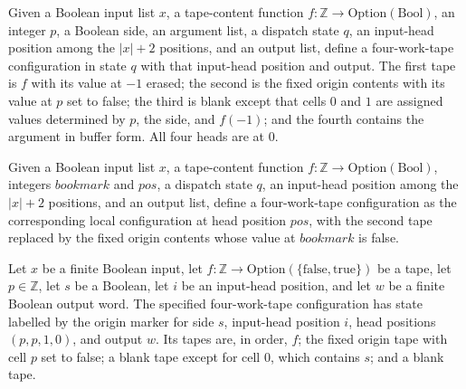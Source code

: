 \begin{definition}
\label{Turing.oracleReadyCfg}
\leanok
{}
Given a Boolean input list $x$, a tape-content function $f:\mathbb
Z\to\mathrm{Option}(\mathrm{Bool})$, an integer $p$, a Boolean side, an argument list, a
dispatch state $q$, an input-head position among the $|x|+2$ positions, and an output
list, define a four-work-tape configuration in state $q$ with that input-head position
and output. The first tape is $f$ with its value at $-1$ erased; the second is the fixed
origin contents with its value at $p$ set to false; the third is blank except that cells
$0$ and $1$ are assigned values determined by $p$, the side, and $f(-1)$; and the fourth
contains the argument in buffer form. All four heads are at $0$.
\end{definition}

\begin{definition}
\label{Turing.oracleBackCfg}
\leanok
{}
Given a Boolean input list $x$, a tape-content function $f:\mathbb
Z\to\mathrm{Option}(\mathrm{Bool})$, integers $bookmark$ and $pos$, a dispatch state
$q$, an input-head position among the $|x|+2$ positions, and an output list, define a
four-work-tape configuration as the corresponding local configuration at head position
$pos$, with the second tape replaced by the fixed origin contents whose value at
$bookmark$ is false.
\end{definition}

\begin{definition}
\label{Turing.oracleMarkedCfg}
\leanok
{}
Let $x$ be a finite Boolean input, let
$f\colon\mathbb{Z}\to\mathrm{Option}(\{\mathrm{false},\mathrm{true}\})$ be a tape, let
$p\in\mathbb{Z}$, let $s$ be a Boolean, let $i$ be an input-head position, and let $w$
be a finite Boolean output word. The specified four-work-tape configuration has state
labelled by the origin marker for side $s$, input-head position $i$, head positions
$(p,p,1,0)$, and output $w$. Its tapes are, in order, $f$; the fixed origin tape with
cell $p$ set to false; a blank tape except for cell $0$, which contains $s$; and a blank
tape.
\end{definition}

